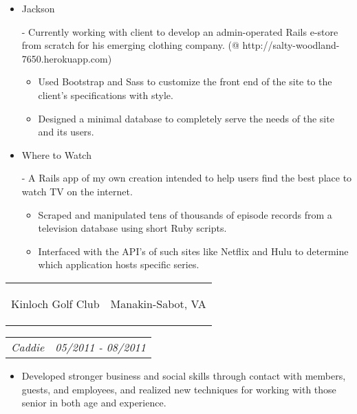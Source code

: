 \documentclass[11pt]{article}
\makeatletter
\newcommand{\headerrow}[2]
{\begin{tabular*}{\linewidth}{l@{\extracolsep{\fill}}r}
	#1 &
	#2 \\
\end{tabular*}}
\makeatother
\begin{document}
\vspace{-0.8em}
\begin{itemize}
	\item \begin{large}\begin{bf}Jackson\end{bf}\end{large} - Currently working with client to develop an admin-operated Rails e-store from scratch for his emerging clothing company. (@ http://salty-woodland-7650.herokuapp.com)
	\vspace{-0.6em} 
	\begin{itemize}
		\item Used Bootstrap and Sass to customize the front end of the site to the client's specifications with style. 
		\vspace{-0.4em}
		\item Designed a minimal database to completely serve the needs of the site and its users.
	\end{itemize}
	\vspace{-0.8em}
	\item \begin{large}\begin{bf}Where to Watch\end{bf}\end{large} - A Rails app of my own creation intended to help users find the best place to watch TV on the internet.
	\vspace{-0.6em} 
	\begin{itemize}
		\item Scraped and manipulated tens of thousands of episode records from a television database using short Ruby scripts. 
		\item Interfaced with the API's of such sites like Netflix and Hulu to determine which application hosts specific series. 
	\end{itemize}
	\vspace{-0.8em}
	
\end{itemize}

\vspace{0.5em}

\headerrow
	{\begin{Large}Kinloch Golf Club\end{Large}}
	{Manakin-Sabot, VA}
\headerrow
	{\textit{Caddie}}
	{\textit{05/2011 - 08/2011}}
	
\vspace{-0.6em}
\begin{itemize}
	\item Developed stronger business and social skills through contact with members, guests, and employees, and realized new techniques for working with those senior in both age and experience. 
\end{itemize}
\end{document}
